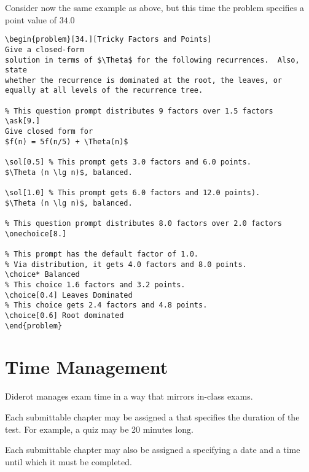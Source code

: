 \begin{cluster}
\label{grp:xmpl:quiz::consider}

\begin{example}
\label{xmpl:quiz::consider}
Consider now the same example as above, but this time
the problem specifies a point value of $34.0$
\begin{lstlisting}
\begin{problem}[34.][Tricky Factors and Points]
Give a closed-form
solution in terms of $\Theta$ for the following recurrences.  Also, state
whether the recurrence is dominated at the root, the leaves, or
equally at all levels of the recurrence tree.

% This question prompt distributes 9 factors over 1.5 factors
\ask[9.]
Give closed form for  
$f(n) = 5f(n/5) + \Theta(n)$

\sol[0.5] % This prompt gets 3.0 factors and 6.0 points.
$\Theta (n \lg n)$, balanced.

\sol[1.0] % This prompt gets 6.0 factors and 12.0 points).
$\Theta (n \lg n)$, balanced.

% This question prompt distributes 8.0 factors over 2.0 factors 
\onechoice[8.] 

% This prompt has the default factor of 1.0.
% Via distribution, it gets 4.0 factors and 8.0 points. 
\choice* Balanced 
% This choice 1.6 factors and 3.2 points.
\choice[0.4] Leaves Dominated  
% This choice gets 2.4 factors and 4.8 points.
\choice[0.6] Root dominated   
\end{problem}
\end{lstlisting}

\end{example}
\end{cluster}


\section{Time Management}
\label{sec:quiz::time-management}

\begin{cluster}
\label{grp:grm:quiz::manages}

\begin{gram}
\label{grm:quiz::manages}
Diderot manages exam time in a way that mirrors in-class exams.

\end{gram}
\end{cluster}

\begin{cluster}
\label{grp:grm:quiz::time-limit-and-due-date}

\begin{gram}
\label{grm:quiz::time-limit-and-due-date}
Each submittable chapter may be assigned a  that
specifies the duration of the test.  For example, a quiz may be 20
minutes long.

Each submittable chapter may also be assigned a  specifying a date and a time until which it must be completed. 

\end{gram}
\end{cluster}

